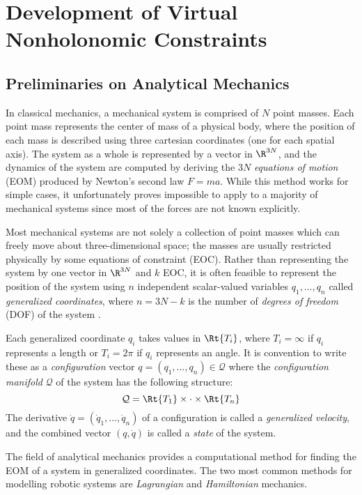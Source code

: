 

\chapter{Development of Virtual Nonholonomic Constraints}
\section{Preliminaries on Analytical Mechanics}
In classical mechanics, a mechanical system is comprised of \(N\) point masses.
Each point mass represents the center of mass of a physical body, where the
position of each mass is described using three cartesian coordinates (one for
each spatial axis).  The system as a whole is represented by a vector in
\(\R^{3N}\), and the dynamics of the system are computed by deriving the \(3N\)
\textit{equations of motion} (EOM) produced by Newton's second law \(F = m a\).
While this method works for simple cases, it unfortunately proves impossible to
apply to a majority of mechanical systems since most of the forces are not known
explicitly. 

Most mechanical systems are not solely a collection of point masses which can 
freely move about three-dimensional space; the masses are usually restricted
physically by some equations of constraint (EOC). 
Rather than representing the system by one vector in \(\R^{3N}\) and \(k\) EOC, 
it is often feasible to represent the position of the system using \(n\)
independent scalar-valued variables \(q_1,\ldots,q_n\) called 
\textit{generalized coordinates}, where \(n = 3N - k\) is the number of
\textit{degrees of freedom} (DOF) of the system \cite{greenwood_dynamics}.

Each generalized coordinate \(q_i\) takes values in \(\Rt{T_i}\), where
\(T_i = \infty\) if \(q_i\) represents a length or \(T_i = 2\pi\) if \(q_i\)
represents an angle.
It is convention to write these as a \textit{configuration} vector 
\(q = (q_1,\ldots,q_n) \in \mathcal{Q}\) 
where the \textit{configuration manifold} \(\mathcal{Q}\) of the system has the
following structure:
\[
    \mathcal{Q} = \Rt{T_1} \times \cdot \times \Rt{T_n}
\] 
The derivative \(\dot{q} = (\dot{q}_1,\ldots,\dot{q}_n)\) of a configuration
is called a \textit{generalized velocity}, and the combined vector
\((q,\dot{q})\) is called a \textit{state} of the system.

The field of analytical mechanics provides a computational method for finding
the EOM of a system in generalized coordinates. The two most common methods for
modelling robotic systems are \textit{Lagrangian} and \textit{Hamiltonian}
mechanics.


